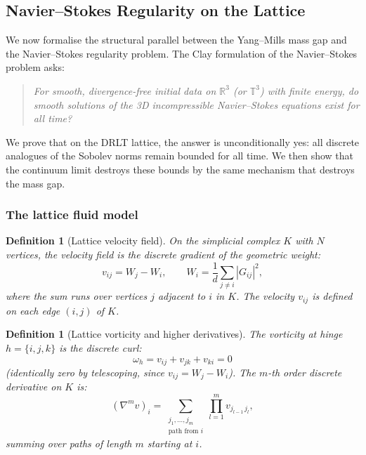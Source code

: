 \documentclass[12pt]{article}
\newtheorem{definition}[theorem]{Definition}
\theoremstyle{remark}
\theoremstyle{definition}
\newcommand{\RR}{\mathbb{R}}
\begin{document}
\subsection{Navier--Stokes Regularity on the Lattice}
\label{sec:navier_stokes}

We now formalise the structural parallel between the Yang--Mills mass
gap and the Navier--Stokes regularity problem.  The Clay formulation
of the Navier--Stokes problem \cite{Clay} asks:

\begin{quote}
\emph{For smooth, divergence-free initial data on $\RR^3$ (or
$\mathbb{T}^3$) with finite energy, do smooth solutions of the
3D incompressible Navier--Stokes equations exist for all time?}
\end{quote}

\noindent
We prove that on the DRLT lattice, the answer is unconditionally yes:
all discrete analogues of the Sobolev norms remain bounded for all time.
We then show that the continuum limit destroys these bounds by the same
mechanism that destroys the mass gap.

\subsubsection{The lattice fluid model}

\begin{definition}[Lattice velocity field]
\label{def:lattice_velocity}
On the simplicial complex $K$ with $N$ vertices, the
\emph{velocity field} is the discrete gradient of the geometric weight:
\begin{equation}
v_{ij} = W_j - W_i, \qquad
W_i = \frac{1}{d} \sum_{j \neq i} |G_{ij}|^2,
\end{equation}
where the sum runs over vertices $j$ adjacent to $i$ in $K$.  The
velocity $v_{ij}$ is defined on each edge $(i,j)$ of $K$.
\end{definition}

\begin{definition}[Lattice vorticity and higher derivatives]
\label{def:lattice_vorticity}
The \emph{vorticity} at hinge $h = \{i, j, k\}$ is the discrete curl:
\begin{equation}
\omega_h = v_{ij} + v_{jk} + v_{ki} = 0
\end{equation}
(identically zero by telescoping, since $v_{ij} = W_j - W_i$).
The $m$-th order \emph{discrete derivative} on $K$ is:
\begin{equation}
(\nabla^m v)_{i} = \sum_{\substack{j_1, \ldots, j_m \\ \text{path from } i}}
\prod_{l=1}^{m} v_{j_{l-1}\, j_l},
\end{equation}
summing over paths of length $m$ starting at $i$.
\end{definition}
\end{document}
